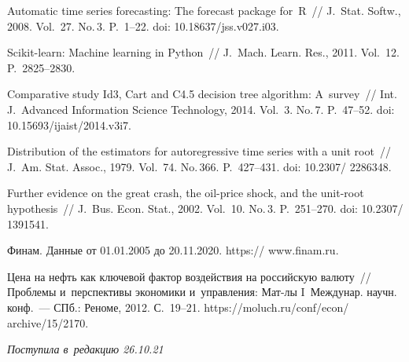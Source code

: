 \begin{multicols}{2}
{{\begin{thebibliography}{99}
Automatic time series forecasting: The forecast package for~R~// J.~Stat. Softw., 2008. Vol.~27. 
No.\,3. P.~1--22. doi: 10.18637/jss.v027.i03.

 Scikit-learn: Machine learning in Python~// J.~Mach. Learn. Res., 
2011. Vol.~12. P.~2825--2830. %

Comparative study Id3, Cart and C4.5 decision tree algorithm: A~survey~// Int. J.~Advanced Information 
Science Technology, 2014. Vol.~3. No.\,7. P.~47--52. doi: 10.15693/ijaist/2014.v3i7.



Distribution of the estimators for autoregressive time series with a unit root~// 
J.~Am. Stat. Assoc., 1979. Vol.~74. No.\,366. P.~427--431. doi: 10.2307/ 2286348.

Further evidence on the great crash, the oil-price shock, and the unit-root hypothesis~// J.~Bus. 
Econ. Stat., 2002. Vol.~10. No.\,3. P.~251--270. doi: 10.2307/ 1391541.

Финам. Данные от 01.01.2005 до 20.11.2020. {\sf https:// www.finam.ru}.

 Цена на нефть как ключевой фактор воздействия на российскую валюту~// 
Проб\-ле\-мы и~перспективы экономики и~управ\-ле\-ния: Мат-лы I~Междунар. на\-учн. конф.~--- 
СПб.: Реноме, 2012. С.~19--21. {\sf  https://moluch.ru/conf/econ/ archive/15/2170}.
\end{thebibliography}

 }
 }

\end{multicols}

\vspace*{-8pt}

\hfill{\small\textit{Поступила в~редакцию 26.10.21}}

\vspace*{8pt}


